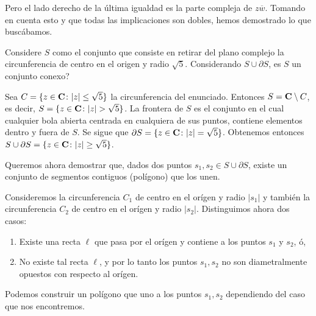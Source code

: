\documentclass{article}
\begin{document}
Pero el lado derecho de la última igualdad es la parte compleja
de $z\overline{w}$. Tomando en cuenta esto y que todas las implicaciones son dobles,
hemos demostrado lo que buscábamos.

\exercise
Considere $S$ como el conjunto que consiste en retirar del
plano complejo la circunferencia de centro en el origen y radio $\sqrt5$.
Considerando $S \cup \partial S$, es $S$ un conjunto conexo?

\solution
Sea $C = \{ z\in\mathbf{C}\colon |z| \leq \sqrt{5} \}$ la circunferencia del enunciado.
Entonces $S = \mathbf{C}\setminus C$, es decir, $S = \{ z\in\mathbf{C}\colon |z| > \sqrt{5} \}$.
La frontera de $S$ es el conjunto en el cual cualquier bola abierta centrada en cualquiera de
sus puntos, contiene elementos dentro y fuera de $S$.
Se sigue que $\partial S = \{z\in\mathbf{C}\colon |z| = \sqrt{5}\}$.
Obtenemos entonces $S\cup\partial S = \{ z\in\mathbf{C}\colon |z| \geq \sqrt{5} \}$.

Queremos ahora demostrar que, dados dos puntos $s_1,s_2\in S\cup\partial S$, existe un conjunto
de segmentos contiguos (polígono) que los unen.

Consideremos la circunferencia $C_1$ de centro en el orígen y radio $|s_1|$ y también la
circunferencia $C_2$ de centro en el orígen y radio $|s_2|$.
Distinguimos ahora dos casos:
\begin{enumerate}
    \item Existe una recta $\ell$ que pasa por el orígen y contiene a los puntos $s_1$ y $s_2$, ó,
    \item No existe tal recta $\ell$, y por lo tanto los puntos $s_1,s_2$ no son
        diametralmente opuestos con respecto al orígen.
\end{enumerate}

Podemos construir un polígono que uno a los puntos $s_1,s_2$ dependiendo del caso que nos encontremos.
\end{document}
